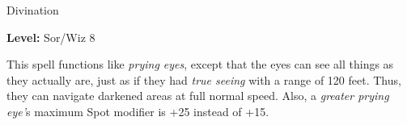 \label{spell:Greater Prying Eyes}

Divination

\textbf{Level:} Sor/Wiz 8

This spell functions like \textit{prying eyes}, except that the eyes can see all 
things as they actually are, just as if they had \textit{true seeing} with a range 
of 120 feet. Thus, they can navigate darkened areas at full normal speed. Also, 
a \textit{greater prying eye'}s maximum Spot modifier is +25 instead of +15.

